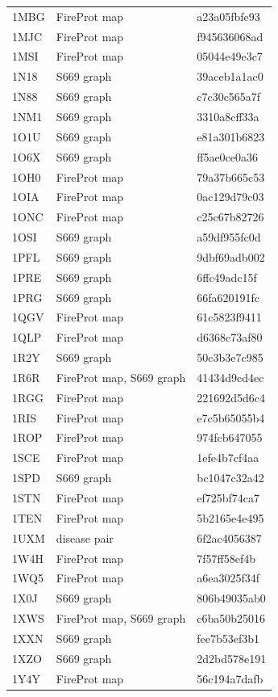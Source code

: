 \begin{longtable}{lll}
1MBG & FireProt map & a23a05fbfe93\\
1MJC & FireProt map & f945636068ad\\
1MSI & FireProt map & 05044e49e3c7\\
1N18 & S669 graph & 39aceb1a1ac0\\
1N88 & S669 graph & c7c30c565a7f\\
1NM1 & S669 graph & 3310a8cff33a\\
1O1U & S669 graph & e81a301b6823\\
1O6X & S669 graph & ff5ae0ce0a36\\
1OH0 & FireProt map & 79a37b665c53\\
1OIA & FireProt map & 0ac129d79c03\\
1ONC & FireProt map & c25c67b82726\\
1OSI & S669 graph & a59df955fc0d\\
1PFL & S669 graph & 9dbf69adb002\\
1PRE & S669 graph & 6ffc49adc15f\\
1PRG & S669 graph & 66fa620191fc\\
1QGV & FireProt map & 61c5823f9411\\
1QLP & FireProt map & d6368c73af80\\
1R2Y & S669 graph & 50c3b3e7c985\\
1R6R & FireProt map, S669 graph & 41434d9cd4ec\\
1RGG & FireProt map & 221692d5d6c4\\
1RIS & FireProt map & e7c5b65055b4\\
1ROP & FireProt map & 974fcb647055\\
1SCE & FireProt map & 1efe4b7cf4aa\\
1SPD & S669 graph & bc1047c32a42\\
1STN & FireProt map & ef725bf74ca7\\
1TEN & FireProt map & 5b2165e4e495\\
1UXM & disease pair & 6f2ac4056387\\
1W4H & FireProt map & 7f57ff58ef4b\\
1WQ5 & FireProt map & a6ea3025f34f\\
1X0J & S669 graph & 806b49035ab0\\
1XWS & FireProt map, S669 graph & c6ba50b25016\\
1XXN & S669 graph & fee7b53ef3b1\\
1XZO & S669 graph & 2d2bd578e191\\
1Y4Y & FireProt map & 56c194a7dafb\\

\end{longtable}
